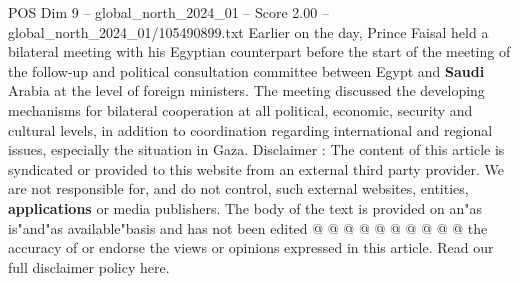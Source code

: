 \begin{textsample}{POS Dim 9 – global\_north\_2024\_01 – Score 2.00 – global\_north\_2024\_01/105490899.txt}
Earlier on the day, Prince Faisal held a bilateral meeting with his Egyptian counterpart before the start of the meeting of the follow-up and political consultation committee between Egypt and \textbf{Saudi} Arabia at the level of foreign ministers.
The meeting discussed the developing mechanisms for bilateral cooperation at all political, economic, security and cultural levels, in addition to coordination regarding international and regional issues, especially the situation in Gaza.
Disclaimer : The content of this article is syndicated or provided to this website from an external third party provider.
We are not responsible for, and do not control, such external websites, entities, \textbf{applications} or media publishers.
The body of the text is provided on an"as is"and"as available"basis and has not been edited @ @ @ @ @ @ @ @ @ @ the accuracy of or endorse the views or opinions expressed in this article.
Read our full disclaimer policy here.

\end{textsample}
